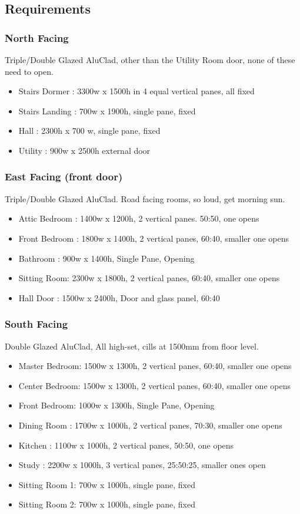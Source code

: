 \subsection{Requirements}
\subsubsection{North Facing}
Triple/Double Glazed AluClad, other than the Utility Room door, none of these need to open.
\begin{itemize}
\item Stairs Dormer : 3300w x 1500h in 4 equal vertical panes, all fixed
\item Stairs Landing : 700w x 1900h, single pane, fixed
\item Hall : 2300h x 700 w, single pane, fixed
\item Utility : 900w x 2500h external door
\end{itemize}    
    
\subsubsection{East Facing (front door)}
Triple/Double Glazed AluClad. Road facing rooms, so loud, get morning sun.
\begin{itemize}
\item Attic Bedroom : 1400w x 1200h, 2 vertical panes. 50:50, one opens
\item Front Bedroom : 1800w x 1400h, 2 vertical panes, 60:40, smaller one opens
\item Bathroom : 900w x 1400h, Single Pane, Opening
\item Sitting Room: 2300w x 1800h, 2 vertical panes, 60:40, smaller one opens
\item Hall Door : 1500w x 2400h, Door and glass panel, 60:40
    
\end{itemize}

\subsubsection{South Facing}
Double Glazed AluClad, All high-set, cills at 1500mm from floor level.
\begin{itemize}
\item Master Bedroom: 1500w x 1300h, 2 vertical panes, 60:40, smaller one opens
\item Center Bedroom: 1500w x 1300h, 2 vertical panes, 60:40, smaller one opens
\item Front Bedroom: 1000w x 1300h, Single Pane, Opening
\item Dining Room : 1700w x 1000h, 2 vertical panes, 70:30, smaller one opens
\item Kitchen : 1100w x 1000h, 2 vertical panes, 50:50, one opens
\item Study :   2200w x 1000h, 3 vertical panes, 25:50:25, smaller ones open
\item Sitting Room 1: 700w x 1000h, single pane, fixed
\item Sitting Room 2: 700w x 1000h, single pane, fixed
\end{itemize}

